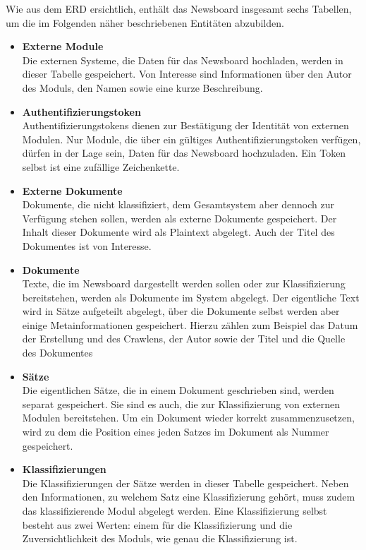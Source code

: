 Wie aus dem ERD ersichtlich, enthält das Newsboard insgesamt sechs Tabellen, um die im Folgenden näher beschriebenen Entitäten abzubilden.
\begin{itemize}
	\item \textbf{Externe Module}\\
	Die externen Systeme, die Daten für das Newsboard hochladen, werden in dieser Tabelle
	gespeichert. Von Interesse sind Informationen über den Autor des Moduls,
	den Namen sowie eine kurze Beschreibung.
	\item \textbf{Authentifizierungstoken}\\
	Authentifizierungstokens dienen zur Bestätigung der Identität von externen Modulen.
	Nur Module, die über ein gültiges Authentifizierungstoken verfügen, dürfen in der Lage
	sein, Daten für das Newsboard hochzuladen. Ein Token selbst ist eine zufällige
	Zeichenkette.
	\item \textbf{Externe Dokumente}\\
	Dokumente, die nicht klassifiziert, dem Gesamtsystem aber dennoch zur Verfügung 
	stehen sollen, werden als externe Dokumente gespeichert. Der Inhalt dieser Dokumente 
	wird als Plaintext abgelegt. Auch der Titel des Dokumentes ist von Interesse.
	\item \textbf{Dokumente}\\
	Texte, die im Newsboard dargestellt werden sollen oder zur Klassifizierung 
	bereitstehen, werden als Dokumente im System abgelegt. Der eigentliche Text wird 
	in Sätze aufgeteilt abgelegt, über die Dokumente selbst werden aber einige 
	Metainformationen gespeichert. Hierzu zählen zum Beispiel das Datum der Erstellung und
	des Crawlens, der Autor sowie der Titel und die Quelle des Dokumentes
	\item \textbf{Sätze}\\
	Die eigentlichen Sätze, die in einem Dokument geschrieben sind, werden separat 
	gespeichert. Sie sind es auch, die zur Klassifizierung von externen Modulen 
	bereitstehen. Um ein Dokument wieder korrekt zusammenzusetzen, wird zu dem die 
	Position eines jeden Satzes im Dokument als Nummer gespeichert.
	\item \textbf{Klassifizierungen}\\
	Die Klassifizierungen der Sätze werden in dieser Tabelle gespeichert. Neben den 
	Informationen, zu welchem Satz eine Klassifizierung gehört, muss zudem das 
	klassifizierende Modul abgelegt werden. Eine Klassifizierung selbst besteht aus zwei 
	Werten: einem für die Klassifizierung und die Zuversichtlichkeit des Moduls, wie genau 
	die Klassifizierung ist. 
\end{itemize}

